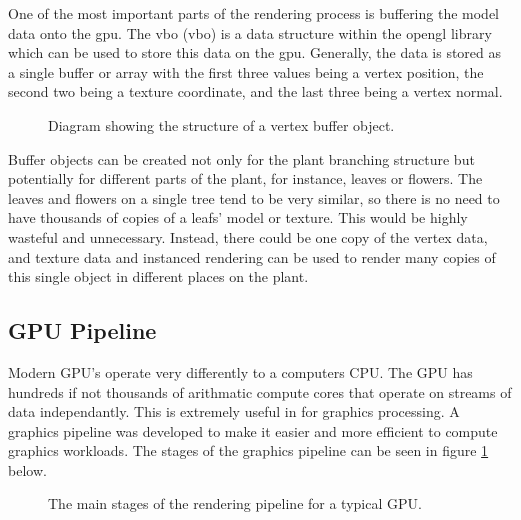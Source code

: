 One of the most important parts of the rendering process is buffering the model data onto the \acrshort{gpu}. The \acrlong{vbo} (\acrshort{vbo}) is a data structure within the \acrshort{opengl} library which can be used to store this data on the \acrshort{gpu}. Generally, the data is stored as a single buffer or array with the first three values being a vertex position, the second two being a texture coordinate, and the last three being a vertex normal.

\begin{figure}[htbp]
	{\centering
		\vspace{7px}
		\setlength{\fboxrule}{1pt}
		\caption{Diagram showing the structure of a vertex buffer object.}
	}
\end{figure}
\FloatBarrier

\noindent
Buffer objects can be created not only for the plant branching structure but potentially for different parts of the plant, for instance, leaves or flowers. The leaves and flowers on a single tree tend to be very similar, so there is no need to have thousands of copies of a leafs' model or texture. This would be highly wasteful and unnecessary. Instead, there could be one copy of the vertex data, and texture data and instanced rendering can be used to render many copies of this single object in different places on the plant. 

\subsection{GPU Pipeline}

Modern GPU's operate very differently to a computers CPU. The GPU has hundreds if not thousands of arithmatic compute cores that operate on streams of data independantly. This is extremely useful in for graphics processing. A graphics pipeline was developed to make it easier and more efficient to compute graphics workloads. The stages of the graphics pipeline can be seen in figure \ref{graphics pipeline} below.

\begin{figure}[htbp]
	{\centering
		\vspace{7px}
		\setlength{\fboxrule}{1pt}
		\caption{The main stages of the rendering pipeline for a typical GPU.} \label{graphics pipeline}
	}
\end{figure}
\FloatBarrier

